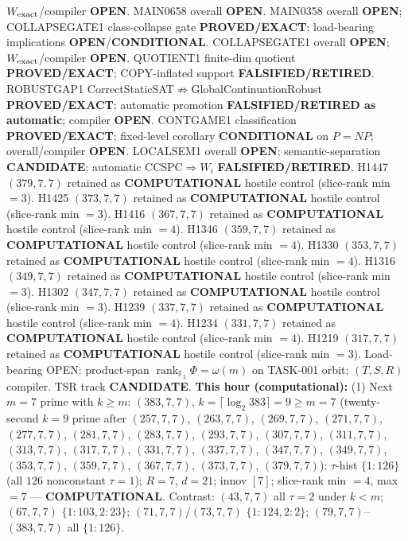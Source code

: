 \documentclass[11pt]{article}
\begin{document}
$W_{\rm exact}$/compiler \textbf{OPEN}.
MAIN0658 overall \textbf{OPEN}.
MAIN0358 overall \textbf{OPEN}; COLLAPSEGATE1 class-collapse gate \textbf{PROVED/EXACT};
load-bearing implications \textbf{OPEN}/\textbf{CONDITIONAL}.
COLLAPSEGATE1 overall \textbf{OPEN}; $W_{\rm exact}$/compiler \textbf{OPEN}.
QUOTIENT1 finite-dim quotient \textbf{PROVED/EXACT}; COPY-inflated support \textbf{FALSIFIED/RETIRED}.
ROBUSTGAP1 CorrectStaticSAT$\not\Rightarrow$GlobalContinuationRobust \textbf{PROVED/EXACT};
automatic promotion \textbf{FALSIFIED/RETIRED as automatic}; compiler \textbf{OPEN}.
CONTGAME1 classification \textbf{PROVED/EXACT}; fixed-level corollary \textbf{CONDITIONAL} on $P=NP$;
overall/compiler \textbf{OPEN}.
LOCALSEM1 overall \textbf{OPEN}; semantic-separation \textbf{CANDIDATE}; automatic CCSPC$\Rightarrow W_i$
\textbf{FALSIFIED/RETIRED}.
H1447 $(379,7,7)$ retained as \textbf{COMPUTATIONAL} hostile control (slice-rank min $=3$).
H1425 $(373,7,7)$ retained as \textbf{COMPUTATIONAL} hostile control (slice-rank min $=3$).
H1416 $(367,7,7)$ retained as \textbf{COMPUTATIONAL} hostile control (slice-rank min $=4$).
H1346 $(359,7,7)$ retained as \textbf{COMPUTATIONAL} hostile control (slice-rank min $=4$).
H1330 $(353,7,7)$ retained as \textbf{COMPUTATIONAL} hostile control (slice-rank min $=4$).
H1316 $(349,7,7)$ retained as \textbf{COMPUTATIONAL} hostile control (slice-rank min $=3$).
H1302 $(347,7,7)$ retained as \textbf{COMPUTATIONAL} hostile control (slice-rank min $=3$).
H1239 $(337,7,7)$ retained as \textbf{COMPUTATIONAL} hostile control (slice-rank min $=4$).
H1234 $(331,7,7)$ retained as \textbf{COMPUTATIONAL} hostile control (slice-rank min $=4$).
H1219 $(317,7,7)$ retained as \textbf{COMPUTATIONAL} hostile control (slice-rank min $=3$).
Load-bearing OPEN: product-span $\operatorname{rank}_{\mathbb F_2}\Phi=\omega(m)$ on TASK-001 orbit;
$(T,S,R)$ compiler. TSR track \textbf{CANDIDATE}.
\textbf{This hour (computational):}
(1) Next $m{=}7$ prime with $k{\ge}m$: $(383,7,7)$, $k{=}\lceil\log_2 383\rceil=9{\ge}m{=}7$
(twenty-second $k{=}9$ prime after $(257,7,7)$, $(263,7,7)$, $(269,7,7)$, $(271,7,7)$, $(277,7,7)$, $(281,7,7)$, $(283,7,7)$, $(293,7,7)$, $(307,7,7)$, $(311,7,7)$, $(313,7,7)$, $(317,7,7)$, $(331,7,7)$, $(337,7,7)$, $(347,7,7)$, $(349,7,7)$, $(353,7,7)$, $(359,7,7)$, $(367,7,7)$, $(373,7,7)$, $(379,7,7)$):
$\tau$-hist $\{1{:}126\}$ (all $126$ nonconstant $\tau{=}1$); $R{=}7$, $d{=}21$; innov $[7]$;
slice-rank min $=4$, max $=7$ --- \textbf{COMPUTATIONAL}.
Contrast: $(43,7,7)$ all $\tau{=}2$ under $k{<}m$; $(67,7,7)$ $\{1{:}103,2{:}23\}$;
$(71,7,7)$/$(73,7,7)$ $\{1{:}124,2{:}2\}$; $(79,7,7)$--$(383,7,7)$ all $\{1{:}126\}$.
\end{document}
